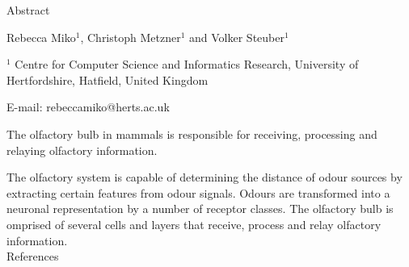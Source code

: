 \documentclass[11pt]{report}
\begin{document}
{\Huge Abstract}

Rebecca Miko$^1$, Christoph Metzner$^1$ and Volker Steuber$^1$

$^1$ Centre for Computer Science and Informatics Research, University of Hertfordshire, Hatfield, United Kingdom 

E-mail: rebeccamiko@herts.ac.uk

The olfactory bulb in mammals is responsible for receiving, processing and relaying olfactory information.


The olfactory system is capable of determining the distance of odour sources by extracting certain features from odour signals. 
Odours are transformed into a neuronal representation by a number of receptor classes.
The olfactory bulb is omprised of several  cells and layers that receive, process and relay olfactory information.\\




{\Huge References}
\end{document}
